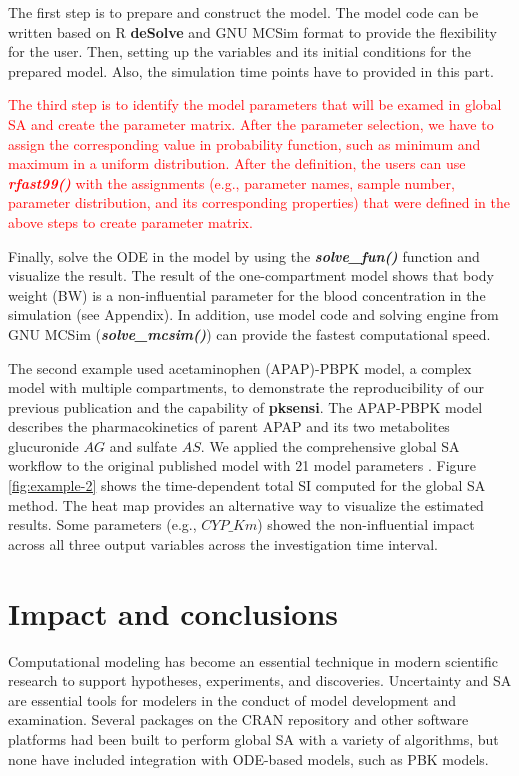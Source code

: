 \documentclass[preprint,12pt, a4paper]{elsarticle}
\begin{document}
The first step is to prepare and construct the model. The model code can be written based on R \textbf{deSolve} and GNU MCSim format to provide the flexibility for the user. Then, setting up the variables and its initial conditions for the prepared model. Also, the simulation time points have to provided in this part.

\textcolor{red}{The third step is to identify the model parameters that will be examed in global SA and create the parameter matrix. After the parameter selection, we have to assign the corresponding value in probability function, such as minimum and maximum in a uniform distribution. After the definition, the users can use \textit{\textbf{rfast99()}} with the assignments (e.g., parameter names, sample number, parameter distribution, and its corresponding properties) that were defined in the above steps to create parameter matrix.}

Finally, solve the ODE in the model by using the \textit{\textbf{solve\_fun()}} function and visualize the result. The result of the one-compartment model shows that body weight (BW) is a non-influential parameter for the blood concentration in the simulation (see Appendix). In addition, use model code and solving engine from GNU MCSim (\textit{\textbf{solve\_mcsim()}}) can provide the fastest computational speed.

The second example used acetaminophen (APAP)-PBPK model, 
a complex model with multiple compartments, to demonstrate the reproducibility of our previous publication \cite{fphar201800588} and the capability of \textbf{pksensi}. The APAP-PBPK model describes the pharmacokinetics of parent APAP and its two metabolites glucuronide \(AG\) and sulfate \(AS\). We applied the comprehensive global SA workflow to the original published model with 21 model parameters \cite{s13318-015-0253-x}. Figure \ref{fig:example-2} shows the time-dependent total SI computed for the global SA method. The heat map provides an alternative way to visualize the estimated results. Some parameters (e.g., \(CYP\_Km\)) showed the non-influential impact across all three output variables across the investigation time interval.


\section{Impact and conclusions}

Computational modeling has become an essential technique in modern scientific research to support hypotheses, experiments, and discoveries. Uncertainty and SA are essential tools for modelers in the conduct of model development and examination. Several packages on the CRAN repository and other software platforms had been built to perform global SA with a variety of algorithms, but none have included integration with ODE-based models, such as PBK models. 
\end{document}
